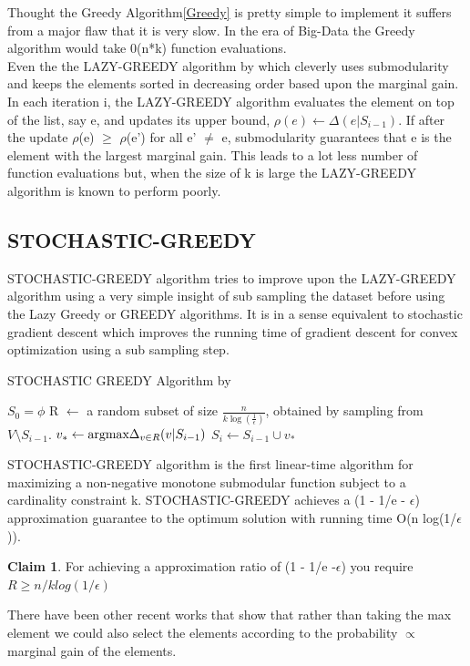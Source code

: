 \documentclass[a4paper,twoside]{iiththesis}
\theoremstyle{definition}
\theoremstyle{definition}
\newtheorem{claim}{Claim}[section]
\theoremstyle{remark}
\begin{document}
Thought the Greedy Algorithm\ref{Greedy} is pretty simple to implement it suffers from a major flaw that it is very slow. In the era of Big-Data the Greedy algorithm would take 0(n*k) function evaluations. \\

Even the the  LAZY-GREEDY algorithm by \cite{minoux1978accelerated} which cleverly uses submodularity and keeps the elements  sorted in decreasing order based upon the marginal gain. In each iteration i, the LAZY-GREEDY algorithm evaluates the element on top of the list, say e, and updates its upper bound,
$\rho(e) \leftarrow \Delta(e|S_{i -1})$. If after the update $\rho$(e) $\geq$ $\rho$(e') for all e' $\neq$ e, submodularity guarantees that e is the element with the largest marginal gain. This leads to a lot less number of function evaluations but, when the size of k is large the  LAZY-GREEDY algorithm is known to perform poorly.

\subsection{STOCHASTIC-GREEDY} \label{lazier}

STOCHASTIC-GREEDY \cite{mirzasoleiman2015lazier} algorithm tries to improve upon the LAZY-GREEDY algorithm using a very simple insight of sub sampling the dataset before using the Lazy Greedy or GREEDY algorithms. It is in a sense equivalent to stochastic gradient descent which improves the running time of gradient descent for convex optimization using a sub sampling step.
\
\begin{algorithm}
\caption{STOCHASTIC GREEDY Algorithm by \cite{mirzasoleiman2015lazier}}
\label{SGreedy}
\begin{algorithmic}[1]
\Ensure{subset $S_k \subseteq V$ of size k}
\State $S_0= \phi$ 
\State R $\leftarrow$ a random subset of size $\frac{n}{k\log(\frac{1}{\epsilon})}$, obtained by sampling from $V \setminus S_{i-1}$.
\State $ v_{*} \leftarrow \text{argmax}\space \space \Delta_{v\in R}(v| S_{i-1})$
\State $S_i \leftarrow S_{i-1} \cup {v_*}$
\EndFor
\end{algorithmic}
\end{algorithm}

STOCHASTIC-GREEDY algorithm is the  first linear-time algorithm for maximizing a non-negative monotone submodular function subject to a cardinality constraint k. STOCHASTIC-GREEDY achieves a (1 - 1/e - $\epsilon$) approximation guarantee to the optimum solution with running time O(n log(1/$\epsilon$)). \\
\theoremstyle{claim} 
\begin{claim}
For achieving a approximation ratio of (1 - 1/e -$ \epsilon$) you require $R \geq n/k log(1/\epsilon)$
\end{claim}
There have been other recent works \cite{tschiatschek2018differentiable} that show that rather than taking the max element we could also select the elements according to the probability $\propto$ marginal gain of the elements. 
\end{document}
